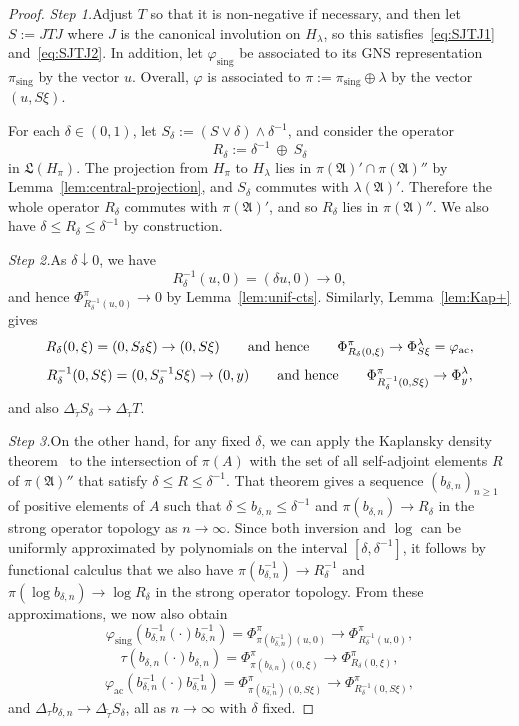 \documentclass[12pt,a4paper]{article}
\numberwithin{equation}{section}
\theoremstyle{remark}
\renewcommand{\rm}[1]{\mathrm{#1}}
\newcommand{\A}{\mathfrak{A}}
\newcommand{\frL}{\mathfrak{L}}
\renewcommand{\phi}{\varphi}
\renewcommand{\l}{\lambda}
\renewcommand{\t}[1]{\widetilde{#1}}
\begin{document}
\begin{proof}
\emph{Step 1.}\quad Adjust $T$ so that it is non-negative if necessary, and then let $S:= JTJ$ where $J$ is the canonical involution on $H_\l$, so this satisfies~\eqref{eq:SJTJ1} and~\eqref{eq:SJTJ2}.  In addition, let $\phi_{\rm{sing}}$ be associated to its GNS representation $\pi_{\rm{sing}}$ by the vector $u$.  Overall, $\phi$ is associated to $\pi := \pi_{\rm{sing}} \oplus \l$ by the vector $(u,S\xi)$.

For each $\delta \in (0,1)$, let $S_\delta:= (S\vee \delta)\wedge \delta^{-1}$, and consider the operator
\[R_\delta := \delta^{-1} \ \oplus \ S_\delta\]
in $\frL(H_\pi)$. The projection from $H_\pi$ to $H_\l$ lies in $\pi(\A)' \cap \pi(\A)''$ by Lemma~\ref{lem:central-projection}, and $S_\delta$ commutes with $\l(\A)'$.  Therefore the whole operator $R_\delta$ commutes with $\pi(\A)'$, and so $R_\delta$ lies in $\pi(\A)''$.  We also have $\delta \le R_\delta \le \delta^{-1}$ by construction.

\vspace{7pt}

\emph{Step 2.}\quad As $\delta \downarrow 0$, we have
\[R_\delta^{-1}(u,0) = (\delta u,0) \to 0,\]
and hence $\Phi^\pi_{R_\delta^{-1}(u,0)} \to 0$ by Lemma~\ref{lem:unif-cts}. Similarly, Lemma~\ref{lem:Kap+} gives 
\[R_\delta(0,\xi) = (0,S_\delta\xi) \to (0,S\xi) \qquad \hbox{and hence} \qquad \Phi^\pi_{R_\delta(0,\xi)} \to \Phi^\l_{S\xi} = \phi_{\rm{ac}},\]
\[R_\delta^{-1}(0,S\xi) = (0,S_\delta^{-1}S\xi)\to (0,y) \qquad \hbox{and hence} \qquad \Phi^\pi_{R_\delta^{-1}(0,S\xi)} \to \Phi^\l_y,\]
and also $\Delta_{\t{\tau}} S_\delta \to \Delta_{\t{\tau}} T$.

\vspace{7pt}

\emph{Step 3.}\quad On the other hand, for any fixed $\delta$, we can apply the Kaplansky density theorem~\cite[Sec. I.3.5]{Dix--vN} to the intersection of $\pi(A)$ with the set of all self-adjoint elements $R$ of $\pi(\A)''$ that satisfy $\delta \le R \le \delta^{-1}$.  That theorem gives a sequence $(b_{\delta,n})_{n\ge 1}$ of positive elements of $A$ such that $\delta \le b_{\delta,n} \le \delta^{-1}$ and $\pi(b_{\delta,n}) \to R_\delta$ in the strong operator topology as $n\to\infty$.  Since both inversion and $\log$ can be uniformly approximated by polynomials on the interval $[\delta,\delta^{-1}]$, it follows by functional calculus that we also have $\pi(b_{\delta,n}^{-1}) \to R_\delta^{-1}$ and $\pi (\log b_{\delta,n})\to \log R_\delta$ in the strong operator topology.  From these approximations, we now also obtain
\[\phi_{\rm{sing}}(b_{\delta,n}^{-1}(\cdot)b_{\delta,n}^{-1}) = \Phi^\pi_{\pi(b_{\delta,n}^{-1})(u,0)} \to \Phi^\pi_{R_\delta^{-1}(u,0)},\]
\[\tau(b_{\delta,n}(\cdot)b_{\delta,n})  = \Phi^\pi_{\pi(b_{\delta,n})(0,\xi)} \to \Phi^\pi_{R_\delta(0,\xi)},\]
\[\phi_{\rm{ac}}(b_{\delta,n}^{-1}(\cdot) b_{\delta,n}^{-1}) = \Phi^\pi_{\pi(b_{\delta,n}^{-1})(0,S\xi)} \to \Phi^\pi_{R_\delta^{-1}(0,S\xi)},\]
and $\Delta_\tau b_{\delta,n} \to \Delta_{\t{\tau}} S_\delta$, all as $n\to\infty$ with $\delta$ fixed.


\end{proof}
\end{document}

